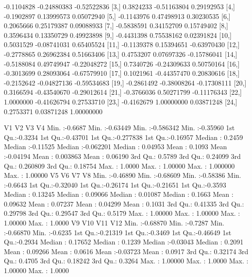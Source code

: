 \documentclass[a4paper]{ article}
\begin{document}
\begin{table}[H]
\begin{Schunk}
\begin{Soutput}
 [2,] -0.1104828 -0.24880383 -0.52522836
 [3,]  0.3824233 -0.51163804  0.29192953
 [4,] -0.1902897  0.13999573  0.05072940
 [5,] -0.1143976  0.47498913  0.30230535
 [6,]  0.2065666  0.25179387  0.09088933
 [7,] -0.5838591  0.34152709  0.15749402
 [8,]  0.3596434  0.13350729  0.49923898
 [9,] -0.4431398  0.75538162  0.02391824
[10,]  0.5031529 -0.08741031  0.65405524
[11,] -0.1139378  0.15394651 -0.63970430
[12,] -0.2778865  0.26962384  0.51663406
[13,]  0.4753207  0.07697326 -0.15786041
[14,] -0.5188084  0.49749947 -0.22048272
[15,]  0.7340726 -0.24309633  0.50750164
[16,] -0.3013699  0.28093064 -0.67579910
[17,]  0.1021961 -0.44357470  0.20830616
[18,] -0.2152642 -0.04827136 -0.59534683
[19,] -0.2861492 -0.38008264 -0.17308111
[20,]  0.3166594 -0.43540670 -0.29012614
[21,] -0.3766036  0.50271799 -0.11176343
[22,]  1.0000000 -0.41626794  0.27533710
[23,] -0.4162679  1.00000000  0.03871248
[24,]  0.2753371  0.03871248  1.00000000
\end{Soutput}
\begin{Soutput}
       V1                V2                 V3                  V4          
 Min.   :-0.6687   Min.   :-0.63449   Min.   :-0.586342   Min.   :-0.35960  
 1st Qu.:-0.3234   1st Qu.:-0.43701   1st Qu.:-0.277838   1st Qu.:-0.16957  
 Median : 0.2459   Median :-0.11525   Median :-0.062201   Median : 0.04953  
 Mean   : 0.1093   Mean   :-0.04194   Mean   : 0.003863   Mean   : 0.06190  
 3rd Qu.: 0.5789   3rd Qu.: 0.24099   3rd Qu.: 0.260809   3rd Qu.: 0.18754  
 Max.   : 1.0000   Max.   : 1.00000   Max.   : 1.000000   Max.   : 1.00000  
       V5                 V6                 V7                 V8         
 Min.   :-0.46890   Min.   :-0.68609   Min.   :-0.58386   Min.   :-0.6643  
 1st Qu.:-0.32040   1st Qu.:-0.26174   1st Qu.:-0.21651   1st Qu.:-0.3593  
 Median : 0.13245   Median : 0.09066   Median : 0.01087   Median : 0.1663  
 Mean   : 0.09632   Mean   : 0.07237   Mean   : 0.04299   Mean   : 0.1031  
 3rd Qu.: 0.41335   3rd Qu.: 0.29798   3rd Qu.: 0.29547   3rd Qu.: 0.5179  
 Max.   : 1.00000   Max.   : 1.00000   Max.   : 1.00000   Max.   : 1.0000  
       V9                V10               V11                V12         
 Min.   :-0.68870   Min.   :-0.7287   Min.   :-0.66870   Min.   :-0.6235  
 1st Qu.:-0.21319   1st Qu.:-0.3469   1st Qu.:-0.46649   1st Qu.:-0.2934  
 Median : 0.17652   Median : 0.1239   Median :-0.03043   Median : 0.2091  
 Mean   : 0.09266   Mean   : 0.0616   Mean   :-0.03723   Mean   : 0.0917  
 3rd Qu.: 0.32174   3rd Qu.: 0.4705   3rd Qu.: 0.18242   3rd Qu.: 0.3264  
 Max.   : 1.00000   Max.   : 1.0000   Max.   : 1.00000   Max.   : 1.0000  

\end{Soutput}
\end{Schunk}
\end{table}
\end{document}
